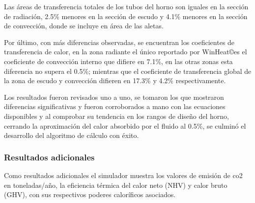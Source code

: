 \par Las áreas de transferencia totales de los tubos del horno son iguales en la sección de radiación, 2.5\% menores en la sección de escudo y 4.1\% menores en la sección de convección, donde se incluye en área de las aletas.
\par Por último, con más diferencias observadas, se encuentran los coeficientes de transferencia de calor, en la zona radiante el único reportado por WinHeat\copyright es el coeficiente de convección interno que difiere en 7.1\%, en las otras zonas esta diferencia no supera el 0.5\%; mientras que el coeficiente de transferencia global de la zona de escudo y convección difieren en 17.3\% y 4.2\% respectivamente.
\par Los resultados fueron revisados uno a uno, se tomaron los que mostraron diferencias significativas y fueron corroborados a mano con las ecuaciones disponibles y al comprobar su tendencia en los rangos de diseño del horno, cerrando la aproximación del calor absorbido por el fluido al 0.5\%, se culminó el desarrollo del algoritmo de cálculo con éxito.

\subsubsection{Resultados adicionales}
\par Como resultados adicionales el simulador muestra los valores de emisión de \ac{co2} en toneladas/año, la eficiencia térmica del calor neto (NHV) y calor bruto (GHV)\cite{bib:api560}, con sus respectivos poderes caloríficos asociados.

